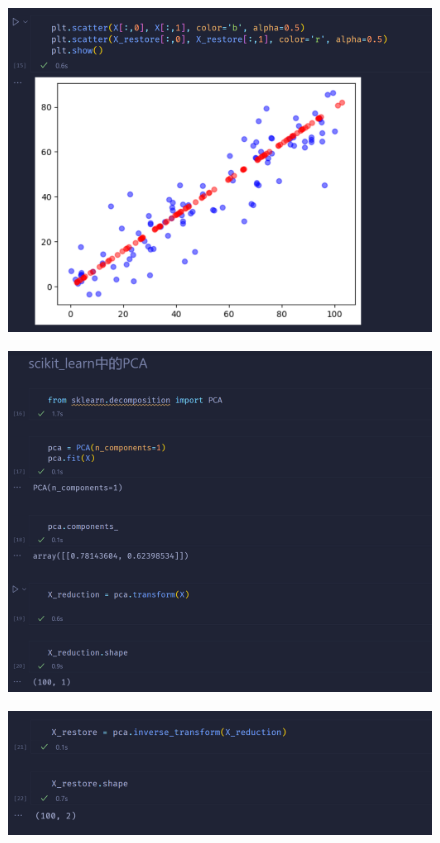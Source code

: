 \documentclass{article}
\begin{document}
\begin{figure}[H]
    \centering
    \includegraphics[width=\linewidth]{3.png}
\end{figure}
\begin{figure}[H]
    \centering
    \includegraphics[width=\linewidth]{4.png}
\end{figure}
\begin{figure}[H]
    \centering
    \includegraphics[width=\linewidth]{5.png}
\end{figure}
\end{document}
